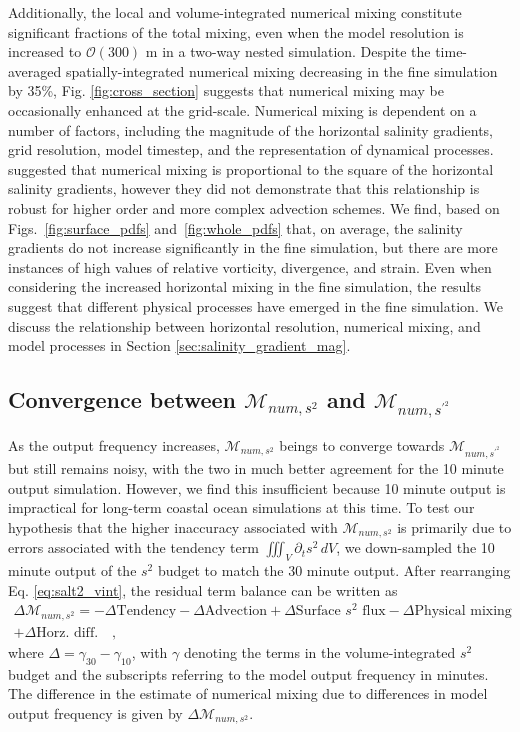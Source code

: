 Additionally, the local and volume-integrated numerical mixing constitute significant fractions of the total mixing, even when the model resolution is increased to $\mathcal{O}(300)$ m in a two-way nested simulation. Despite the time-averaged spatially-integrated numerical mixing decreasing in the fine simulation by 35\%, Fig. \ref{fig:cross_section} suggests that numerical mixing may be occasionally enhanced at the grid-scale. Numerical mixing is dependent on a number of factors, including the magnitude of the horizontal salinity gradients, grid resolution, model timestep, and the representation of dynamical processes. \citet{Wang_2021} suggested that numerical mixing is proportional to the square of the horizontal salinity gradients, however they did not demonstrate that this relationship is robust for higher order and more complex advection schemes. We find, based on Figs.~\ref{fig:surface_pdfs} and~\ref{fig:whole_pdfs} that, on average, the salinity gradients do not increase significantly in the fine simulation, but there are more instances of high values of relative vorticity, divergence, and strain. Even when considering the increased horizontal mixing in the fine simulation, the results suggest that different physical processes have emerged in the fine simulation. We discuss the relationship between horizontal resolution, numerical mixing, and model processes in Section \ref{sec:salinity_gradient_mag}. 

\subsection{Convergence between $\mathcal{M}_{num, s^2}$ and $\mathcal{M}_{num, s^{\prime^2}}$}
\label{sec:s2_online_conv}

As the output frequency increases, $\mathcal{M}_{num,s^2}$ beings to converge towards $\mathcal{M}_{num,s^{\prime^2}}$ but still remains noisy, with the two in much better agreement for the 10 minute output simulation. However, we find this insufficient because 10 minute output is impractical for long-term coastal ocean simulations at this time. To test our hypothesis that the higher inaccuracy associated with $\mathcal{M}_{num, s^2}$ is primarily due to errors associated with the tendency term $\iiint_V \partial_t s^2 \, dV$, we down-sampled the 10 minute output of the $s^2$ budget to match the 30 minute output. After rearranging Eq. \ref{eq:salt2_vint}, the residual term balance can be written as 
\begin{equation} \label{eq:downsampled_termbalance}
    \begin{split}
    \Delta \mathcal{M}_{num, s^2} = -\Delta \textrm{Tendency}-\Delta \textrm{Advection}+\Delta \textrm{Surface $s^2$ flux}-\Delta \textrm{Physical mixing} \\
    + \Delta \textrm{Horz. diff.} \quad ,
    \end{split}
\end{equation}
where $\Delta = \gamma_{30}-\gamma_{10}$, with $\gamma$ denoting the terms in the volume-integrated $s^2$ budget and the subscripts referring to the model output frequency in minutes. The difference in the estimate of numerical mixing due to differences in model output frequency is given by $\Delta \mathcal{M}_{num, s^2}$. 

